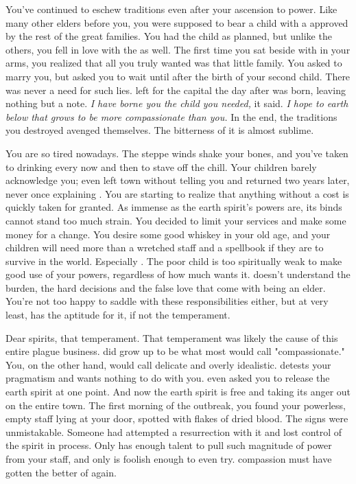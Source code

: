 \documentclass[char]{Pestilence}
\begin{document}
You've continued to eschew traditions even after your ascension to power. Like many other elders before you, you were supposed to bear a child with a \cElderSpouse{\human} approved by the rest of the great families. You had the child as planned, but unlike the others, you fell in love with the \cElderSpouse{\human} as well. The first time you sat beside \cElderSpouse{\intro} with \cApprentice{} in your arms, you realized that all you truly wanted was that little family. You asked \cElderSpouse{\them} to marry you, but \cElderSpouse{\they} asked you to wait until after the birth of your second child. There was never a need for such lies. \cElderSpouse{} left for the capital the day after \cRebel{} was born, leaving nothing but a note. \textit{I have borne you the child you needed,} it said. \textit{I hope to earth below that \cRebel{\they} grows to be more compassionate than you.} In the end, the traditions you destroyed avenged themselves. The bitterness of it is almost sublime.

You are so tired nowadays. The steppe winds shake your bones, and you've taken to drinking every now and then to stave off the chill. Your children barely acknowledge you; \cApprentice{} even left town without telling you and returned two years later, never once explaining \cApprentice{\themself}. You are starting to realize that anything without a cost is quickly taken for granted. As immense as the earth spirit's powers are, its binds cannot stand too much strain. You decided to limit your services and make some money for a change. You desire some good whiskey in your old age, and your children will need more than a wretched staff and a spellbook if they are to survive in the world. Especially \cApprentice{}. The poor child is too spiritually weak to make good use of your powers, regardless of how much \cApprentice{\they} wants it. \cApprentice{\They} doesn't understand the burden, the hard decisions and the false love that come with being an elder. You're not too happy to saddle \cRebel{} with these responsibilities either, but at very least, \cRebel{\they} has the aptitude for it, if not the temperament.

Dear spirits, that temperament. That temperament was likely the cause of this entire plague business. \cRebel{} did grow up to be what most would call "compassionate." You, on the other hand, would call \cRebel{\them} delicate and overly idealistic. \cRebel{} detests your pragmatism and wants nothing to do with you. \cRebel{\They} even asked you to release the earth spirit at one point. And now the earth spirit is free and taking its anger out on the entire town. The first morning of the outbreak, you found your powerless, empty staff lying at your door, spotted with flakes of dried blood. The signs were unmistakable. Someone had attempted a resurrection with it and lost control of the spirit in process. Only \cRebel{} has enough talent to pull such magnitude of power from your staff, and only \cRebel{\they} is foolish enough to even try. \cRebel{\Their} compassion must have gotten the better of \cRebel{\them} again.  
\end{document}
